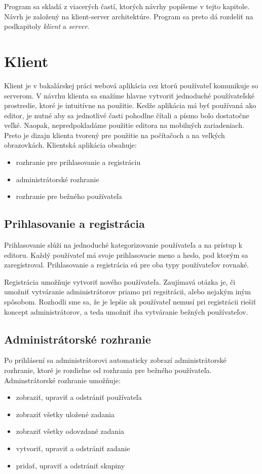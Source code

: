 Program sa skladá z viacerých častí, ktorých návrhy popíšeme v tejto kapitole.
Návrh je založený na klient-server architektúre. Program sa preto dá rozdeliť na 
podkapitoly \textit{klient} a \textit{server}.

\section{Klient}
Klient je v bakalárskej práci webová aplikácia cez ktorú používateľ komunikuje so serverom. V návrhu
klienta sa snažíme hlavne vytvoriť jednoduché používateľské prostredie, ktoré je intuitívne na
použitie. Kedže aplikácia má byť používaná ako editor, je nutné aby sa jednotlivé časti pohodlne
čítali a písmo bolo dostatočne veľké. Naopak, nepredpokladáme použitie editora na mobilných
zariadeniach. Preto je dizajn klienta tvorený pre použitie na počítačoch a na veľkých obrazovkách.
Klientská aplikácia obsahuje:
\begin{itemize}
\item rozhranie pre prihlasovanie a registráciu
\item administrátorské rozhranie
\item rozhranie pre bežného používateľa
\end{itemize}

\subsection{Prihlasovanie a registrácia}
Prihlasovanie slúži na jednoduché kategorizovanie používateľa a na prístup k editoru. Každý
používateľ má svoje prihlasovacie meno a heslo, pod ktorým sa zaregistroval. Prihlasovanie a
registrácia sú pre oba typy používateľov rovnaké.

Registrácia umožňuje vytvoriť nového používateľa. Zaujímavá otázka je, či umožniť vytváranie
administrátorov priamo pri regsitrácii, alebo nejakým iným spôsobom. Rozhodli sme sa, že je lepšie
ak používateľ nemusí pri registrácii riešiť koncept administrátorov, a teda umožniť iba vytváranie
bežných používateľov. 

\subsection{Administrátorské rozhranie}
Po prihlásení sa administrátorovi automaticky zobrazí administrátorské rozhranie, ktoré je rozdielne
od rozhrania pre bežného používateľa. Adminstrátorské rozhranie umožňuje:
\begin{itemize}
\item zobraziť, upraviť a odstrániť používateľa
\item zobraziť všetky uložené zadania
\item zobraziť všetky odovzdané zadania
\item vytvoriť, upraviť a odstrániť zadanie
\item pridať, upraviť a odstrániť skupiny
\end{itemize}

